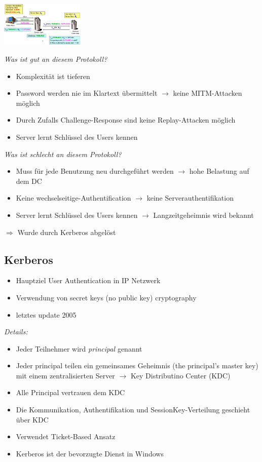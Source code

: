 \documentclass{report}
\newenvironment{Figure}
	{\par\medskip\noindent\minipage{\linewidth}}
	{\endminipage\par\medskip}
\theoremstyle{definition}
\theoremstyle{example}
\begin{document}
\begin{Figure}
\centering
\includegraphics[width=150px]{img/NTLM.png}
	\label{fig:Abbildung des Schemas für NTLM Protocol}
\end{Figure}
\textit{Was ist gut an diesem Protokoll?}
\begin{itemize}
	\item Komplexität ist tieferen
	\item Password werden nie im Klartext übermittelt $\rightarrow$ keine MITM-Attacken möglich
	\item Durch Zufalls Challenge-Response sind keine Replay-Attacken möglich
	\item Server lernt Schlüssel des Users kennen
\end{itemize}

\textit{Was ist schlecht an diesem Protokoll?}
\begin{itemize}
	\item Muss für jede Benutzung neu durchgeführt werden $\rightarrow$ hohe Belastung auf dem DC
	\item Keine wechselseitige-Authentification $\rightarrow$ keine Serverauthentifikation
	\item Server lernt Schlüssel des Users kennen $\rightarrow$ Langzeitgeheimnis wird bekannt
\end{itemize}
$\Rightarrow$ Wurde durch Kerberos abgelöst

	\subsection{Kerberos}
\begin{itemize}
	\item Hauptziel User Authentication in IP Netzwerk
	\item Verwendung von secret keys (no public key) cryptography
	\item letztes update 2005
\end{itemize}

\textit{Details:}
\begin{itemize}
	\item Jeder Teilnehmer wird \textit{principal} genannt
	\item Jeder principal teilen ein gemeinsames Geheimnis (the principal's master key) mit einem zentralisierten Server $\rightarrow$ Key Distributino Center (KDC)
	\item Alle Principal vertrauen dem KDC
	\item Die Kommunikation, Authentifikation und SessionKey-Verteilung geschieht über KDC
	\item Verwendet Ticket-Based Ansatz
	\item Kerberos ist der bevorzugte Dienst in Windows
\end{itemize}
\end{document}
